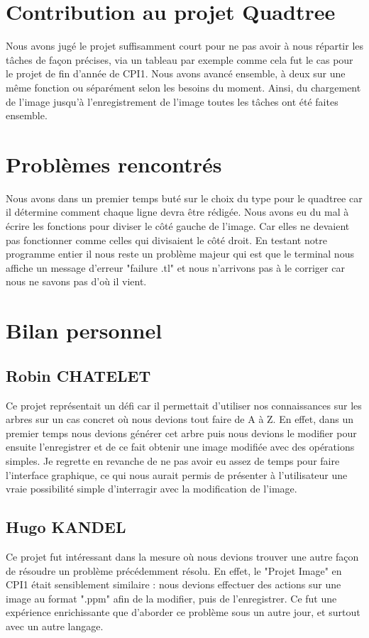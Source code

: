 \documentclass[12pt,a4paper]{article}
\begin{document}
\section{Contribution au projet Quadtree}
Nous avons jugé le projet suffisamment court pour ne pas avoir à nous répartir les tâches de façon précises, via un tableau par exemple comme cela fut le cas pour le projet de fin d'année de CPI1. Nous avons avancé ensemble, à deux sur une même fonction ou séparément selon les besoins du moment. Ainsi, du chargement de l'image jusqu'à l'enregistrement de l'image toutes les tâches ont été faites ensemble. 

\section{Problèmes rencontrés}
Nous avons dans un premier temps buté sur le choix du type pour le quadtree car il détermine comment chaque ligne devra être rédigée. Nous avons eu du mal à écrire les fonctions pour diviser le côté gauche de l'image. Car elles ne devaient pas fonctionner comme celles qui divisaient le côté droit. En testant notre programme entier il nous reste un problème majeur qui est que le terminal nous affiche un message d'erreur "failure .tl" et nous n'arrivons pas à le corriger car nous ne savons pas d'où il vient.  

\section{Bilan personnel}
\subsection{Robin CHATELET}
Ce projet représentait un défi car il permettait d'utiliser nos connaissances sur les arbres sur un cas concret où nous devions tout faire de A à Z. En effet, dans un premier temps nous devions générer cet arbre puis nous devions le modifier pour ensuite l'enregistrer et de ce fait obtenir une image modifiée avec des opérations simples. Je regrette en revanche de ne pas avoir eu assez de temps pour faire l'interface graphique, ce qui nous aurait permis de présenter à l'utilisateur une vraie possibilité simple d'interragir avec la modification de l'image. 

\subsection{Hugo KANDEL}
Ce projet fut intéressant dans la mesure où nous devions trouver une autre façon de résoudre un problème précédemment résolu.\newline
En effet, le "Projet Image" en CPI1 était sensiblement similaire : nous devions effectuer des actions sur une image au format ".ppm" afin de la modifier, puis de l'enregistrer.\newline
Ce fut une expérience enrichissante que d'aborder ce problème sous un autre jour, et surtout avec un autre langage.
\end{document}
